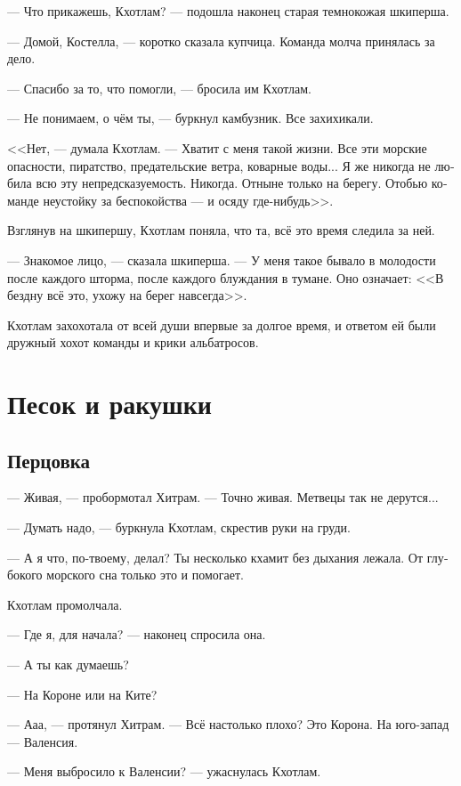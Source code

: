 \documentclass[a4paper,12pt,fleqn]{book}\usepackage{cooltooltips}\usepackage{polyglossia}\setdefaultlanguage{russian}\setotherlanguage{english}\defaultfontfeatures{Ligatures=TeX,Mapping=tex-text} \usepackage{xcolor}\definecolor{lightgray}{HTML}{bbbbbb}\color{lightgray}\newcommand{\ml}[3]{\textenglish{\textcolor{black}{#3}}}
\begin{document}
--- Что прикажешь, Кхотлам? --- подошла наконец старая темнокожая шкиперша.

--- Домой, Костелла, --- коротко сказала купчица.
Команда молча принялась за дело.

--- Спасибо за то, что помогли, --- бросила им Кхотлам.

--- Не понимаем, о чём ты, --- буркнул камбузник.
Все захихикали.

<<Нет, --- думала Кхотлам.
--- Хватит с меня такой жизни.
Все эти морские опасности, пиратство, предательские ветра, коварные воды...
Я же никогда не любила всю эту непредсказуемость.
Никогда.
Отныне только на берегу.
Отобью команде неустойку за беспокойства --- и осяду где-нибудь>>.

Взглянув на шкипершу, Кхотлам поняла, что та, всё это время следила за ней.

--- Знакомое лицо, --- сказала шкиперша.
--- У меня такое бывало в молодости после каждого шторма, после каждого блуждания в тумане.
Оно означает: <<В бездну всё это, ухожу на берег навсегда>>.

Кхотлам захохотала от всей души впервые за долгое время, и ответом ей были дружный хохот команды и крики альбатросов.

\chapter{Песок и ракушки}

\section{Перцовка}

--- Живая, --- пробормотал Хитрам.
--- Точно живая.
Метвецы так не дерутся...

--- Думать надо, --- буркнула Кхотлам, скрестив руки на груди.

--- А я что, по-твоему, делал?
Ты несколько кхамит без дыхания лежала.
От глубокого морского сна только это и помогает.

Кхотлам промолчала.

--- Где я, для начала? --- наконец спросила она.

--- А ты как думаешь?

--- На Короне или на Ките?

--- Ааа, --- протянул Хитрам.
--- Всё настолько плохо?
Это Корона.
На юго-запад --- Валенсия.

--- Меня выбросило к Валенсии? --- ужаснулась Кхотлам.
\end{document}
